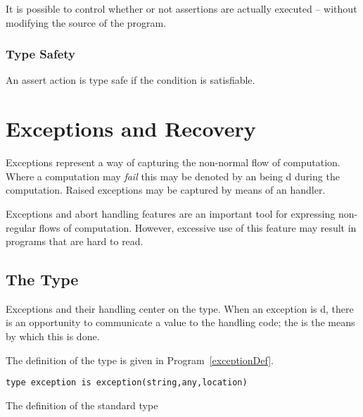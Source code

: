\begin{aside}
It is possible to control whether or not assertions are actually executed -- without modifying the source of the program.
\end{aside}


\subsubsection{Type Safety}
An assert action is type safe if the condition is satisfiable.

\begin{prooftree}
\end{prooftree}

\section{Exceptions and Recovery}
\label{exceptions}
Exceptions represent a way of capturing the non-normal flow of computation. Where a computation may \emph{fail} this may be denoted by an  being d during the computation. Raised exceptions may be captured by means of an  handler.
\begin{aside}
Exceptions and abort handling features are an important tool for expressing non-regular flows of computation. However, excessive use of this feature may result in programs that are hard to read.
\end{aside}

\subsection{The  Type}
\label{exceptionType}
Exceptions and their handling center on the  type. When an exception is d, there is an opportunity to communicate a value to the handling code; the  is the means by which this is done.

The definition of the  type is given in Program~\vref{exceptionDef}.
\begin{program}
\begin{lstlisting}
type exception is exception(string,any,location)
\end{lstlisting}
\caption{The definition of the standard  type\label{exceptionDef}}
\end{program}

